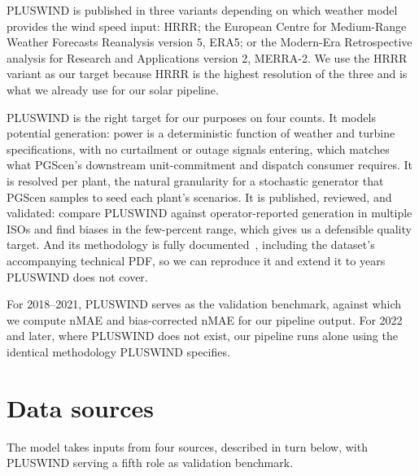 \documentclass[11pt]{article}
\begin{document}
PLUSWIND is published in three variants depending on which weather
model provides the wind speed input: HRRR; the European Centre for
Medium-Range Weather Forecasts Reanalysis version 5, ERA5; or the
Modern-Era Retrospective analysis for Research and Applications
version 2, MERRA-2. We use the HRRR variant as our target because HRRR
is the highest resolution of the three and is what we already use for
our solar pipeline.

PLUSWIND is the right target for our purposes on four counts. It models
potential generation: power is a deterministic function of weather and
turbine specifications, with no curtailment or outage signals entering,
which matches what PGScen's downstream unit-commitment and dispatch
consumer requires. It is resolved per plant, the natural granularity for
a stochastic generator that PGScen samples to seed each plant's
scenarios. It is published, reviewed, and validated:
\citet{millstein2023pluswind} compare PLUSWIND against operator-reported
generation in multiple ISOs and find biases in the few-percent range,
which gives us a defensible quality target. And its methodology is fully
documented~\citep{millstein2023pluswind}, including the dataset's
accompanying technical PDF, so we can reproduce it and extend it to
years PLUSWIND does not cover.

For 2018--2021, PLUSWIND serves as the validation benchmark, against
which we compute nMAE and bias-corrected nMAE for our pipeline output.
For 2022 and later, where PLUSWIND does not exist, our pipeline runs
alone using the identical methodology PLUSWIND specifies.

\section{Data sources}
\label{sec:data}

The model takes inputs from four sources, described in turn below, with
PLUSWIND serving a fifth role as validation benchmark.
\end{document}
